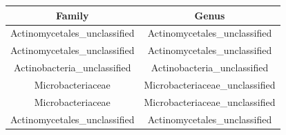 \documentclass[]{article}
\begin{document}
\begin{longtable}[]{@{}cc@{}}
\toprule
\begin{minipage}[b]{0.41\columnwidth}\centering
Family\strut
\end{minipage} & \begin{minipage}[b]{0.43\columnwidth}\centering
Genus\strut
\end{minipage}\tabularnewline
\midrule
\endhead
\begin{minipage}[t]{0.41\columnwidth}\centering
Actinomycetales\_unclassified\strut
\end{minipage} & \begin{minipage}[t]{0.43\columnwidth}\centering
Actinomycetales\_unclassified\strut
\end{minipage}\tabularnewline
\begin{minipage}[t]{0.41\columnwidth}\centering
Actinomycetales\_unclassified\strut
\end{minipage} & \begin{minipage}[t]{0.43\columnwidth}\centering
Actinomycetales\_unclassified\strut
\end{minipage}\tabularnewline
\begin{minipage}[t]{0.41\columnwidth}\centering
Actinobacteria\_unclassified\strut
\end{minipage} & \begin{minipage}[t]{0.43\columnwidth}\centering
Actinobacteria\_unclassified\strut
\end{minipage}\tabularnewline
\begin{minipage}[t]{0.41\columnwidth}\centering
Microbacteriaceae\strut
\end{minipage} & \begin{minipage}[t]{0.43\columnwidth}\centering
Microbacteriaceae\_unclassified\strut
\end{minipage}\tabularnewline
\begin{minipage}[t]{0.41\columnwidth}\centering
Microbacteriaceae\strut
\end{minipage} & \begin{minipage}[t]{0.43\columnwidth}\centering
Microbacteriaceae\_unclassified\strut
\end{minipage}\tabularnewline
\begin{minipage}[t]{0.41\columnwidth}\centering
Actinomycetales\_unclassified\strut
\end{minipage} & \begin{minipage}[t]{0.43\columnwidth}\centering
Actinomycetales\_unclassified\strut
\end{minipage}\tabularnewline

\end{longtable}
\end{document}
